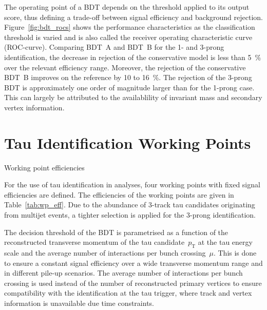 The operating point of a BDT depends on the threshold applied to its output
score, thus defining a trade-off between signal efficiency and background
rejection. Figure~\ref{fig:bdt_rocs} shows the performance characteristics as
the classification threshold is varied and is also called the receiver operating
characteristic curve (ROC-curve). Comparing \mbox{BDT A} and \mbox{BDT B} for
the 1- and 3-prong identification, the decrease in rejection of the conservative
model is less than \SI{5}{\percent} over the relevant efficiency range.
Moreover, the rejection of the conservative \mbox{BDT B} improves on the
reference by \num{10} to \SI{16}{\percent}. The rejection of the 3-prong BDT is
approximately one order of magnitude larger than for the 1-prong case. This can
largely be attributed to the availablility of invariant mass and secondary
vertex information.

\section{Tau Identification Working Points}
\label{sec:bdt_working_points}

\begin{table}[htb]
  \centering
  {\small}
  \caption{Working point efficiencies}
  \label{tab:wp_eff}
\end{table}

For the use of tau identification in analyses, four working points with fixed
signal efficiencies are defined. The efficiencies of the working points are
given in Table~\ref{tab:wp_eff}. Due to the abundance of 3-track tau candidates
originating from multijet events, a tighter selection is applied for the 3-prong
identification.

The decision threshold of the BDT is parametrised as a function of the
reconstructed transverse momentum of the tau candidate~$p_\text{T}$ at the tau
energy scale and the average number of interactions per bunch crossing~$\mu$.
This is done to ensure a constant signal efficiency over a wide transverse
momentum range and in different pile-up scenarios. The average number of
interactions per bunch crossing is used instead of the number of reconstructed
primary vertices to ensure compatibility with the identification at the tau
trigger, where track and vertex information is unavailable due time constraints.

